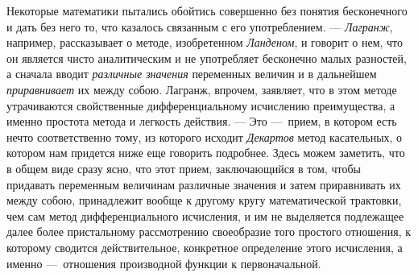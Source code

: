 Некоторые математики пытались обойтись совершенно без понятия бесконечного и
дать без него то, что казалось связанным с его употреблением. —
{\em Лагранж}, например, рассказывает о методе,
изобретенном {\em Ланденом}, и говорит о нем, что он
является чисто аналитическим и не употребляет бесконечно малых разностей, а
сначала вводит {\em различные значения} переменных
величин и в дальнейшем {\em приравнивает} их между
собою. Лагранж, впрочем, заявляет, что в этом методе утрачиваются
свойственные дифференциальному исчислению преимущества, а именно простота
метода и легкость действия. — Это —~прием, в котором есть нечто
соответственно тому, из которого исходит {\em Декартов}
метод касательных, о котором нам придется ниже еще говорить подробнее.
Здесь можем заметить, что в общем виде сразу ясно, что этот прием,
заключающийся в том, чтобы придавать переменным величинам различные
значения и затем приравнивать их между собою, принадлежит вообще к другому
кругу математической трактовки, чем сам метод дифференциального исчисления,
и им не выделяется подлежащее далее более пристальному рассмотрению
своеобразие того простого отношения, к которому сводится действительное,
конкретное определение этого исчисления, а именно —~отношения производной
функции к первоначальной.

